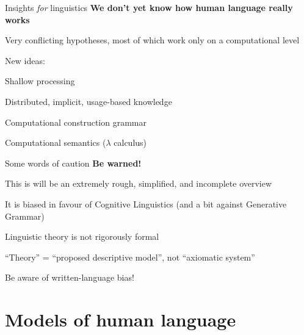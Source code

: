 \documentclass[aspectratio=169,cramped]{beamer}
\let\tempone\itemize
\let\temptwo\enditemize
\renewenvironment{itemize}{\tempone\addtolength{\itemsep}{-0\baselineskip}\addtolength{\parskip}{-0.2\baselineskip}}{\temptwo}
\begin{document}
\begin{frame}{Insights \textit{for} linguistics}
	\textbf{We don't yet know how human language really works}
	\begin{itemize}
  \item Very conflicting hypotheses, most of which work only on a computational level
  \item New ideas:
    \begin{itemize}
    \item Shallow processing
    \item Distributed, implicit, usage-based knowledge
    \item Computational construction grammar
    \item Computational semantics (\(\lambda\) calculus)
    \end{itemize}
  \end{itemize}
\end{frame}

\begin{frame}{Some words of caution}
  \textbf{Be warned!}
  \begin{itemize}
  \item This is will be an extremely rough, simplified, and incomplete overview
  \item It is biased in favour of Cognitive Linguistics (and a bit against Generative Grammar)
  \item Linguistic theory is not rigorously formal
    \begin{itemize}
    \item ``Theory'' = ``proposed descriptive model'', not ``axiomatic system''
    \end{itemize}
  \item Be aware of written-language bias!
  \end{itemize}
\end{frame}

\section{Models of human language}
\end{document}
